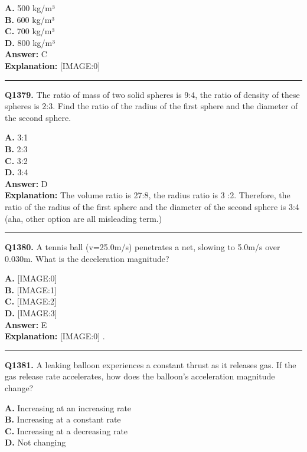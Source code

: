 \documentclass[12pt]{article}
\begin{document}
\textbf{A.} 500 kg/m³ \\
\textbf{B.} 600 kg/m³ \\
\textbf{C.} 700 kg/m³ \\
\textbf{D.} 800 kg/m³ \\

\textbf{Answer:} C \\
\textbf{Explanation:} [IMAGE:0]

\hrule
\vspace{1em}


\noindent
\textbf{Q1379.} The ratio of mass of two solid spheres is 9:4, the ratio of density of these spheres is 2:3. Find the ratio of the radius of the first sphere and the diameter of the second sphere.



\textbf{A.} 3:1 \\
\textbf{B.} 2:3 \\
\textbf{C.} 3:2 \\
\textbf{D.} 3:4 \\

\textbf{Answer:} D \\
\textbf{Explanation:} The volume ratio is 27:8, the radius ratio is 3 :2. Therefore, the ratio of the radius of the first sphere and the diameter of the second sphere is 3:4 (aha, other option are all misleading term.)

\hrule
\vspace{1em}


\noindent
\textbf{Q1380.} A tennis ball (v=25.0m/s)
penetrates a net, slowing to 5.0m/s
over 0.030m.
What is the deceleration magnitude?



\textbf{A.} [IMAGE:0] \\
\textbf{B.} [IMAGE:1] \\
\textbf{C.} [IMAGE:2] \\
\textbf{D.} [IMAGE:3] \\

\textbf{Answer:} E \\
\textbf{Explanation:} [IMAGE:0]
.

\hrule
\vspace{1em}


\noindent
\textbf{Q1381.} A leaking balloon experiences a constant thrust as it releases gas. If the gas release rate accelerates, how does the balloon's acceleration magnitude change?



\textbf{A.} Increasing at an increasing rate \\
\textbf{B.} Increasing at a constant rate \\
\textbf{C.} Increasing at a decreasing rate \\
\textbf{D.} Not changing \\
\end{document}
